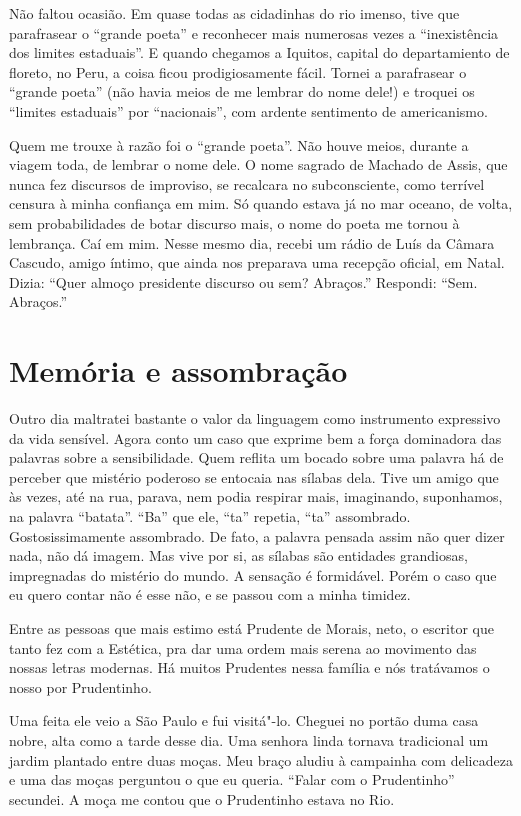 Não faltou ocasião. Em quase todas as cidadinhas do rio imenso, tive que
parafrasear o ``grande poeta'' e reconhecer mais numerosas vezes a
``inexistência dos limites estaduais''. E quando chegamos a Iquitos,
capital do departamiento de floreto, no Peru, a coisa ficou
prodigiosamente fácil. Tornei a parafrasear o ``grande poeta'' (não havia
meios de me lembrar do nome dele!) e troquei os ``limites estaduais'' por
``nacionais'', com ardente sentimento de americanismo.

Quem me trouxe à razão foi o ``grande poeta''. Não houve meios, durante a
viagem toda, de lembrar o nome dele. O nome sagrado de Machado de Assis,
que nunca fez discursos de improviso, se recalcara no subconsciente,
como terrível censura à minha confiança em mim. Só quando estava já no
mar oceano, de volta, sem probabilidades de botar discurso mais, o nome
do poeta me tornou à lembrança. Caí em mim. Nesse mesmo dia, recebi um
rádio de Luís da Câmara Cascudo, amigo íntimo, que ainda nos preparava
uma recepção oficial, em Natal. Dizia: ``Quer almoço presidente discurso
ou sem? Abraços.'' Respondi: ``Sem. Abraços.''

\chapter{Memória e assombração}

Outro dia maltratei bastante o valor da linguagem como instrumento
expressivo da vida sensível. Agora conto um caso que exprime bem a força
dominadora das palavras sobre a sensibilidade. Quem reflita um bocado
sobre uma palavra há de perceber que mistério poderoso se entocaia nas
sílabas dela. Tive um amigo que às vezes, até na rua, parava, nem podia
respirar mais, imaginando, suponhamos, na palavra ``batata''. ``Ba'' que
ele, ``ta'' repetia, ``ta'' assombrado. Gostosissimamente assombrado. De
fato, a palavra pensada assim não quer dizer nada, não dá imagem. Mas
vive por si, as sílabas são entidades grandiosas, impregnadas do
mistério do mundo. A sensação é formidável. Porém o caso que eu quero
contar não é esse não, e se passou com a minha timidez.

Entre as pessoas que mais estimo está Prudente de Morais, neto, o
escritor que tanto fez com a Estética, pra dar uma ordem mais serena ao
movimento das nossas letras modernas. Há muitos Prudentes nessa família
e nós tratávamos o nosso por Prudentinho.

Uma feita ele veio a São Paulo e fui visitá"-lo. Cheguei no portão duma
casa nobre, alta como a tarde desse dia. Uma senhora linda tornava
tradicional um jardim plantado entre duas moças. Meu braço aludiu à
campainha com delicadeza e uma das moças perguntou o que eu queria.
``Falar com o Prudentinho'' secundei. A moça me contou que o Prudentinho
estava no Rio.

